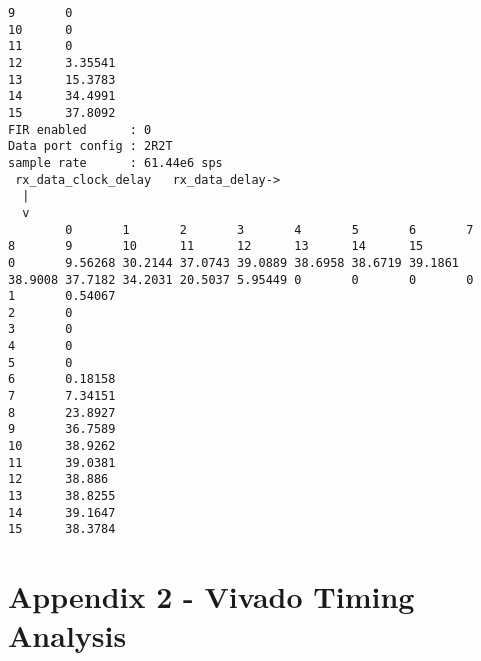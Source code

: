 \documentclass{article}
\begin{document}
\begin{lstlisting}[basicstyle=\scriptsize]
9       0       
10      0       
11      0       
12      3.35541 
13      15.3783 
14      34.4991 
15      37.8092 
FIR enabled      : 0
Data port config : 2R2T
sample rate      : 61.44e6 sps
 rx_data_clock_delay   rx_data_delay->
  |
  v
        0       1       2       3       4       5       6       7       8       9       10      11      12      13      14      15
0       9.56268 30.2144 37.0743 39.0889 38.6958 38.6719 39.1861 38.9008 37.7182 34.2031 20.5037 5.95449 0       0       0       0       
1       0.54067 
2       0       
3       0       
4       0       
5       0       
6       0.18158 
7       7.34151 
8       23.8927 
9       36.7589 
10      38.9262 
11      39.0381 
12      38.886  
13      38.8255 
14      39.1647 
15      38.3784 
\end{lstlisting}
\pagebreak
\section{Appendix 2 - Vivado Timing Analysis} \label{appendix}
\end{document}

